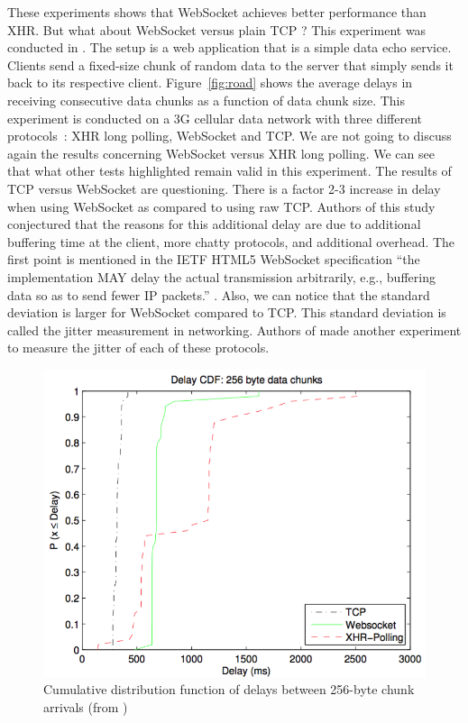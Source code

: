 \documentclass[journal,compsoc]{IEEEtran}
\newcommand{\ws}{WebSocket}
\begin{document}
These experiments shows that \ws{} achieves better performance than XHR.
But what about \ws{} versus plain TCP ?
This experiment was conducted in \cite{roadblock}.
The setup is a web application that is a simple data echo service.
Clients send a fixed-size chunk of random data to the server that simply sends it back to its respective client.
Figure~\ref{fig:road} shows the average delays in receiving consecutive data chunks as a function of data chunk size.
This experiment is conducted on a 3G cellular data network with three different \mbox{protocols :} XHR long polling, \ws{} and TCP.
We are not going to discuss again the results concerning \ws{} versus XHR long polling.
We can see that what other tests highlighted remain valid in this experiment.
The results of TCP versus \ws{} are questioning.
There is a factor 2-3 increase in delay when using \ws{} as compared to using raw TCP.
Authors of this study conjectured that the reasons for this additional delay are due to additional buffering time at the client, more chatty protocols, and additional overhead.
The first point is mentioned in the IETF HTML5 \ws{} specification ``the implementation MAY delay the actual transmission arbitrarily, e.g., buffering data so as to send fewer IP packets.'' \cite{rfc6455}.
Also, we can notice that the standard deviation is larger for \ws{} compared to TCP.
This standard deviation is called the jitter measurement in networking.
Authors of \cite{roadblock} made another experiment to measure the jitter of each of these protocols.
\begin{figure}[!ht]
    \centering
    \includegraphics[width=\linewidth]{road_jitter.png}
    \caption{Cumulative distribution function of delays between 256-byte chunk arrivals (from \cite{roadblock})}
    \label{fig:road2}
\end{figure}
\end{document}
